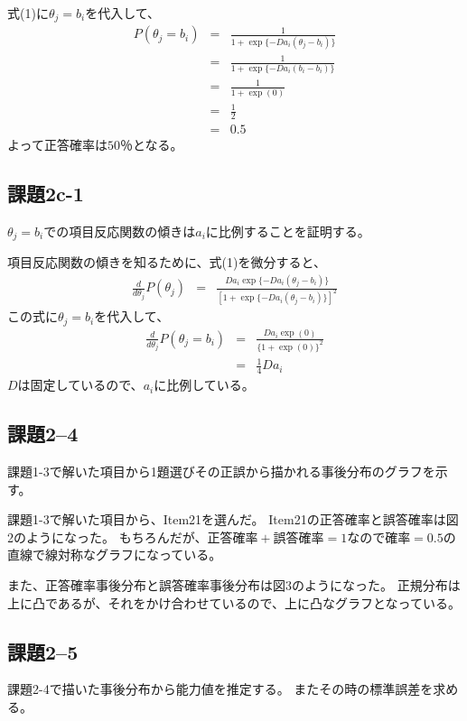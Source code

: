 \documentclass[12pt]{jarticle}
\begin{document}
式(1)に$\theta_j=b_i$を代入して、
\begin{eqnarray*}
    P(\theta_j=b_i)&=&\frac{1}{1+\exp\{-Da_i(\theta_j -b_i)\}}\\
    &=&\frac{1}{1+\exp\{-Da_i(b_i -b_i)\}}\\
    &=&\frac{1}{1+\exp(0)}\\
    &=&\frac{1}{2}\\
    &=&0.5
\end{eqnarray*}
よって正答確率は$50％$となる。

\subsection{課題2c-1}
\begin{shadebox}
    $\theta_j=b_i$での項目反応関数の傾きは$a_i$に比例することを証明する。
\end{shadebox}

項目反応関数の傾きを知るために、式(1)を微分すると、
\begin{eqnarray*}
    \frac{d}{d \theta_j}P(\theta_j)&=& \frac{Da_i\exp\{-Da_i(\theta_j -b_i)\}}{[1+\exp\{-Da_i(\theta_j -b_i)\}]^2}
\end{eqnarray*}
この式に$\theta_j=b_i$を代入して、
\begin{eqnarray*}
    \frac{d}{d \theta_j}P(\theta_j=b_i)&=& \frac{Da_i\exp(0)}{\{1+\exp(0)\}^2}\\
    &=&\frac{1}{4}Da_i
\end{eqnarray*}
$D$は固定しているので、$a_i$に比例している。

\clearpage
\subsection{課題2–4}
\begin{shadebox}
    課題1-3で解いた項目から1題選びその正誤から描かれる事後分布のグラフを示す。
\end{shadebox}

課題1-3で解いた項目から、Item21を選んだ。
Item21の正答確率と誤答確率は図2のようになった。
もちろんだが、$正答確率+誤答確率=1$なので$確率=0.5$の直線で線対称なグラフになっている。

また、正答確率事後分布と誤答確率事後分布は図3のようになった。
正規分布は上に凸であるが、それをかけ合わせているので、上に凸なグラフとなっている。



\subsection{課題2–5}
\begin{shadebox}
    課題2-4で描いた事後分布から能力値を推定する。
    またその時の標準誤差を求める。
\end{shadebox}
\end{document}

